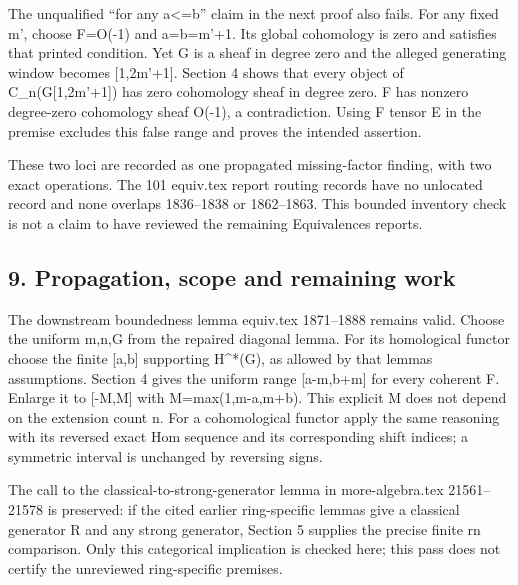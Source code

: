 \documentclass[11pt]{article}
\begin{document}
The unqualified ``for any a<\allowbreak{}=b” claim in the next proof also fails. For any fixed m',\allowbreak{} choose F\allowbreak{}=O(-1)\allowbreak{} and a\allowbreak{}=b\allowbreak{}=m'\allowbreak{}+1. Its global cohomology is zero and satisfies that printed condition. Yet G is a sheaf in degree zero and the alleged generating window becomes [1,\allowbreak{}2m'\allowbreak{}+1]\allowbreak{}. Section 4 shows that every object of C\_\allowbreak{}n(G[1,\allowbreak{}2m'\allowbreak{}+1]\allowbreak{})\allowbreak{} has zero cohomology sheaf in degree zero. F has nonzero degree-zero cohomology sheaf O(-1)\allowbreak{},\allowbreak{} a contradiction. Using F tensor E in the premise excludes this false range and proves the intended assertion.

These two loci are recorded as one propagated missing-factor finding,\allowbreak{} with two exact operations. The 101 equiv.tex report routing records have no unlocated record and none overlaps 1836–\allowbreak{}1838 or 1862–\allowbreak{}1863. This bounded inventory check is not a claim to have reviewed the remaining Equivalences reports.

\subsection{\texorpdfstring{9. Propagation,\allowbreak{} scope and remaining work}{9.  scope and remaining work}}\label{proofs-10691-11108-propagation-scope-and-remaining-work}

The downstream boundedness lemma equiv.tex 1871–\allowbreak{}1888 remains valid. Choose the uniform m,\allowbreak{}n,\allowbreak{}G from the repaired diagonal lemma. For its homological functor choose the finite [a,\allowbreak{}b]\allowbreak{} supporting H\textasciicircum{}*(G)\allowbreak{},\allowbreak{} as allowed by that lemma\textquotesingle s assumptions. Section 4 gives the uniform range [a-m,\allowbreak{}b\allowbreak{}+m]\allowbreak{} for every coherent F. Enlarge it to [-M,\allowbreak{}M]\allowbreak{} with M\allowbreak{}=max(1,\allowbreak{}m-a,\allowbreak{}m\allowbreak{}+b)\allowbreak{}. This explicit M does not depend on the extension count n. For a cohomological functor apply the same reasoning with its reversed exact Hom sequence and its corresponding shift indices; a symmetric interval is unchanged by reversing signs.

The call to the classical-to-strong-generator lemma in more-algebra.tex 21561–\allowbreak{}21578 is preserved:\allowbreak{} if the cited earlier ring-specific lemmas give a classical generator R and any strong generator,\allowbreak{} Section 5 supplies the precise finite rn comparison. Only this categorical implication is checked here; this pass does not certify the unreviewed ring-specific premises.
\end{document}
